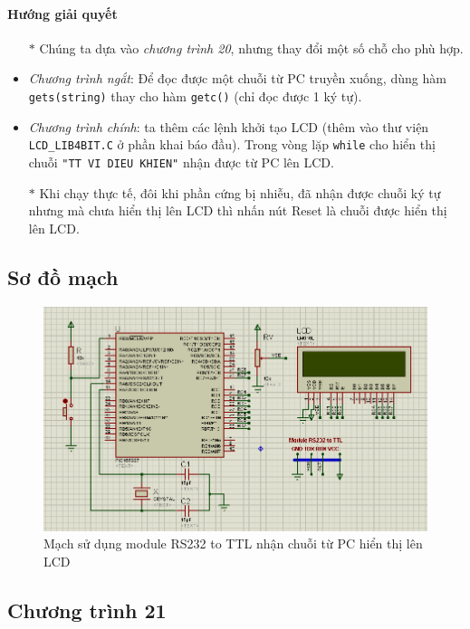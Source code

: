 \paragraph{Hướng giải quyết}
\begin{itemize}
\item[$\ast$] Chúng ta dựa vào \textit{chương trình 20}, nhưng thay đổi một số chỗ cho phù hợp.
\item \textit{Chương trình ngắt}: Để đọc được một chuỗi từ PC truyền xuống, dùng hàm \verb|gets(string)| thay cho hàm \verb|getc()| (chỉ đọc được 1 ký tự).
\item \textit{Chương trình chính}: ta thêm các lệnh khởi tạo LCD (thêm vào thư viện \verb|LCD_LIB4BIT.C| ở phần khai báo đầu). Trong vòng lặp \verb|while| cho hiển thị chuỗi \verb|"TT VI DIEU KHIEN"| nhận được từ PC lên LCD.
\item[$\ast$] Khi chạy thực tế, đôi khi phần cứng bị nhiễu, đã nhận được chuỗi ký tự nhưng mà chưa hiển thị lên LCD thì nhấn nút Reset là chuỗi được hiển thị lên LCD.
\end{itemize}
\newpage
\subsection*{Sơ đồ mạch}
\begin{figure}[!h]
\begin{center}
\includegraphics[scale=0.6]{bai-7/image/BAI-7-2}
\end{center}
\caption{Mạch sử dụng module RS232 to TTL nhận chuỗi từ PC hiển thị lên LCD}
\end{figure}
\subsection*{Chương trình 21}


